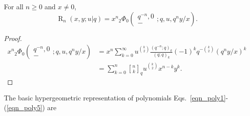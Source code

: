 \documentclass{cimart}
\newcommand{\qbinom}{\genfrac{[}{]}{0pt}{}}
\DeclareMathOperator{\opR}{R}
\begin{document}
\begin{theorem}
For all $n\geq0$ and $x\neq0$,
    \begin{equation}
    \opR_{n}(x,y;u|q)=x^n{}_{2}\Phi_{0}\left(
    \begin{array}{c}
         q^{-n},0 \\
         -
    \end{array}
    ;q,u,q^n y/x    
    \right).
\end{equation}
\end{theorem}
\begin{proof}
    \begin{align*}
        x^n{}_{2}\Phi_{0}\left(
    \begin{array}{c}
         q^{-n},0 \\
         -
    \end{array}
    ;q,u,q^n y/x  
    \right)
    &=x^n\sum_{k=0}^{\infty}u^{\binom{k}{2}}\frac{(q^{-n};q)_{k}}{(q;q)_{k}}(-1)^kq^{-\binom{k}{2}}(q^ny/x)^k\\
    &=\sum_{k=0}^{n}\qbinom{n}{k}_{q}u^{\binom{k}{2}}x^{n-k}y^k.
    \end{align*}
\end{proof}
The basic hypergeometric representation of polynomials Eqs.~\eqref{eqn_poly1}-(\ref{eqn_poly5}) are
\end{document}
